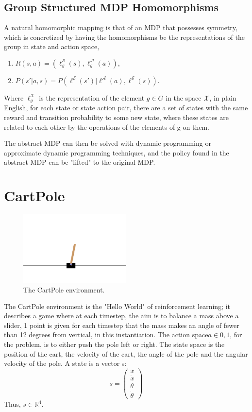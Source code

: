\subsection{Group Structured MDP Homomorphisms}
A natural homomorphic mapping is that of an MDP that possesses symmetry, which is concretized by having the homomorphisms be the representations of the group in state and action space,
\begin{enumerate}
	\item $R(s, a) = (\ell^\mathcal{S}_g(s), \ell^\mathcal{A}_g(a))$,
	\item $P(s'| a, s) =P(\ell^\mathcal{S}(s')| \ell^\mathcal{A}(a), \ell^\mathcal{S}(s))$.
\end{enumerate}
Where $\ell_g^\mathcal{X}$ is the representation of the element $g \in G$ in the space $\mathcal{X}$, in plain English, for each state or state action pair, there are a set of states with the same reward and transition probability to some new state, where these states are related to each other by the operations of the elements of g on them.



The abstract MDP can then be solved with dynamic programming or approximate dynamic programming techniques\cite{van2020plannable, rezaei2022continuous}, and the policy found in the abstract MDP can be "lifted" to the original MDP.



\section{CartPole}\label{sec:cartpole}
\begin{figure}[h!]
	\centering
	\includegraphics[width=0.5\textwidth]{Figures/cart_pole.png}
	\caption{The CartPole environment.}
\end{figure}
The CartPole environment is the "Hello World" of reinforcement learning; it describes a game where at each timestep, the aim is to balance a mass above a slider, 1 point is given for each timestep that the mass makes an angle of fewer than 12 degrees from vertical, in this instantiation. The action space$a \in {0,1}$, for the problem, is to either push the pole left or right. The state space is the position of the cart, the velocity of the cart, the angle of the pole and the angular velocity of the pole. A state is a vector s:
\begin{equation}
	s = \begin{pmatrix}
		x       \\
		\dot{x} \\
		\theta  \\
		\dot{\theta}
	\end{pmatrix}
\end{equation}
Thus, $s \in \mathbb{R}^4$.

